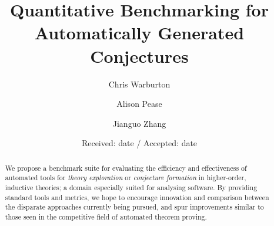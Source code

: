 


\title{Quantitative Benchmarking for Automatically Generated Conjectures%
}


\author{Chris Warburton \and
        Alison Pease    \and
        Jianguo Zhang
}



\date{Received: date / Accepted: date}

\maketitle



\begin{abstract}
  We propose a benchmark suite for evaluating the efficiency and effectiveness
  of automated tools for \emph{theory exploration} or
  \emph{conjecture formation} in higher-order, inductive theories; a domain
  especially suited for analysing software. By providing standard tools and
  metrics, we hope to encourage innovation and comparison between the disparate
  approaches currently being pursued, and spur improvements similar to those
  seen in the competitive field of automated theorem proving.
\end{abstract}

